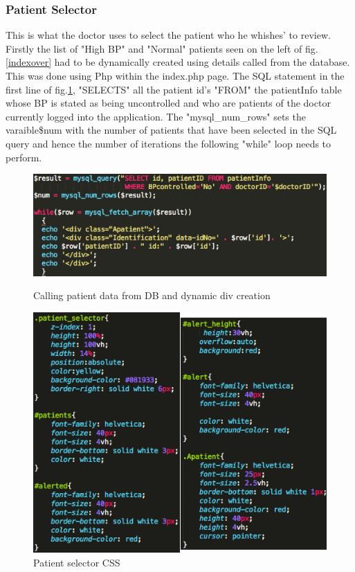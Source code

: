 \documentclass[11pt]{article}
\begin{document}
\subsubsection{Patient Selector} 
This is what the doctor uses to select the patient who he whishes' to review. Firstly the list of "High BP" and "Normal" patients seen on the left of fig.\ref{indexover} had to be dynamically created using details called from the database. This was done using Php within the index.php page. The SQL statement in the first line of fig.\ref{selectorphp}, "SELECTS" all the patient id's "FROM" the patientInfo table whose BP is stated as being uncontrolled and who are patients of the doctor currently logged into the application. The "mysql\_num\_rows" sets the varaible\$num with the number of patients that have been selected in the SQL query and hence the number of iterations the following "while" loop needs to perform. 
\begin{figure}[h!] 
\includegraphics[width=\linewidth]{selectorphp.png}
\caption{Calling patient data from DB and dynamic div creation \label{selectorphp}}
\endminipage\hfill
{}
\includegraphics[width=\linewidth]{selectorCSS.png}
\caption{Patient selector CSS}
\endminipage
\end{figure} 
\end{document}
